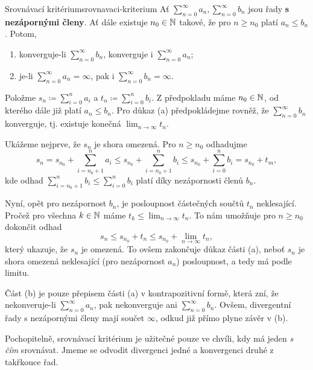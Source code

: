 \begin{proposition}{Srovnávací kritérium}{srovnavaci-kriterium}
 Ať $\sum_{n = 0}^{\infty} a_n, \sum_{n = 0}^{\infty} b_n$ jsou řady \textbf{s
 nezápornými členy}. Ať dále existuje $n_0 \in \mathbb{N}$ takové, že pro $n \geq n_0$
 platí $a_n \leq b_n$. Potom,
 \begin{enumerate}[label=(\alph*)]
  \item konverguje-li $\sum_{n = 0}^{\infty} b_n$, konverguje i $\sum_{n =
   0}^{\infty} a_n$;
  \item je-li $\sum_{n = 0}^{\infty} a_n = \infty$, pak i $\sum_{n = 0}^{\infty}
   b_n = \infty$.
 \end{enumerate}
\end{proposition}
\begin{propproof}
 Položme $s_n \coloneqq \sum_{i=0}^n a_i$ a $t_n \coloneqq \sum_{i=0}^n b_i$. Z
 předpokladu máme $n_0 \in \mathbb{N}$, od kterého dále již platí $a_n \leq b_n$. Pro
 důkaz (a) předpokládejme rovněž, že $\sum_{n = 0}^{\infty} b_n$ konverguje, tj.
 existuje konečná $\lim_{n \to \infty} t_n$.

 Ukážeme nejprve, že $s_n$ je shora omezená. Pro $n \geq n_0$ odhadujme
 \[
  s_n = s_{n_0} + \sum_{i=n_0+1}^n a_i \leq s_{n_0} + \sum_{i=n_0+1}^n b_i \leq
  s_{n_0} + \sum_{i=0}^{n} b_i = s_{n_0} + t_m,
 \]
 kde odhad $\sum_{i=n_0+1}^n b_i \leq \sum_{i=0}^n b_i$ platí díky nezápornosti
 členů $b_n$.

 Nyní, opět pro nezápornost $b_n$, je posloupnost částečných součtů $t_n$
 neklesající. Pročež pro všechna $k \in \mathbb{N}$ máme $t_k
 \leq \lim_{n \to \infty} t_n$. To nám umožňuje pro $n \geq n_0$ dokončit odhad
 \[
  s_n \leq s_{n_0} + t_n \leq s_{n_0} + \lim_{n \to \infty} t_n,
 \]
 který ukazuje, že $s_n$ je omezená. To ovšem zakončuje důkaz části (a), neboť
 $s_n$ je shora omezená neklesající (pro nezápornost $a_n$) posloupnost, a tedy
 má podle  limitu.

 Část (b) je pouze přepisem části (a) v kontrapozitivní formě, která zní, že
 nekonveruje-li $\sum_{n=0}^{\infty} a_n$, pak nekonverguje ani
 $\sum_{n=0}^{\infty} b_n$. Ovšem, divergentní řady s nezápornými členy mají
 součet $\infty$, odkud již přímo plyne závěr v (b).
\end{propproof}

Pochopitelně, srovnávací kritérium je užitečné pouze ve chvíli, kdy má jeden
\emph{s čím} srovnávat. Jmeme se odvodit divergenci jedné a konvergenci druhé z
takřkouce  řad.

